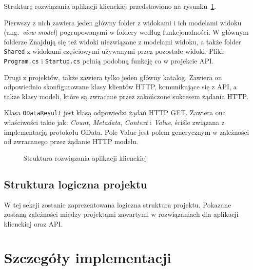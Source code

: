 Strukturę rozwiązania aplikacji klienckiej przedstawiono na rysunku~\ref{fig:fiz-client-2}.

Pierwszy z nich zawiera jeden główny folder z widokami i ich modelami widoku (ang.~\emph{view model}) pogrupowanymi w foldery według funkcjonalności. W głównym folderze Znajdują się też widoki niezwiązane z modelami widoku, a także folder \texttt{Shared} z widokami częściowymi używanymi przez pozostałe widoki. Pliki: \texttt{Program.cs} i \texttt{Startup.cs} pełnią podobną funkcję co w projekcie API.

Drugi z projektów, także zawiera tylko jeden główny katalog. Zawiera on odpowiednio skonfigurowane klasy klientów HTTP, komunikujące się z API, a także klasy modeli, które są zwracane przez zakończone sukcesem żądania HTTP.

Klasa \texttt{ODataResult} jest klasą odpowiedzi żądań HTTP GET. Zawiera ona właściwości takie jak: \emph{Count}, \emph{Metadata}, \emph{Context} i \emph{Value}, ściśle związana z implementacją protokołu OData. Pole Value jest polem generycznym w zależności od zwracanego przez żądanie HTTP modelu. 

\begin{figure}[t]
	\centering
	\caption{Struktura rozwiązania aplikacji klienckiej}
	\label{fig:fiz-client-2}
\end{figure}

\subsection{Struktura logiczna projektu}
\label{sec:struktura-logiczna-projektu}

W tej sekcji zostanie zaprezentowana logiczna struktura projektu. 
Pokazane zostaną zależności między projektami zawartymi w rozwiązaniach dla aplikacji klienckiej oraz API.

\section{Szczegóły implementacji}
\label{sec:szczegoly-implementacji}



